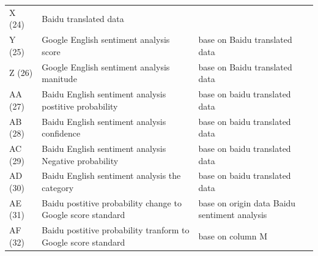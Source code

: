 \begin{center}
\begin{tabular}{lll}
X (24) & Baidu translated data & \\
Y (25) & Google English sentiment analysis score & base on Baidu translated data\\
Z (26) & Google English sentiment analysis manitude & base on Baidu translated data\\
AA (27) & Baidu English sentiment analysis postitive probability & base on baidu translated data\\
AB (28) & Baidu English sentiment analysis confidence & base on baidu translated data\\
AC (29) & Baidu English sentiment analysis Negative probability & base on baidu translated data\\
AD (30) & Baidu English sentiment analysis the category & base on baidu translated data\\
AE (31) & Baidu postitive probability change to Google score standard & base on origin data Baidu sentiment analysis\\
AF (32) & Baidu postitive probability tranform to Google score standard & base on column M\\
\end{tabular}
\end{center}

